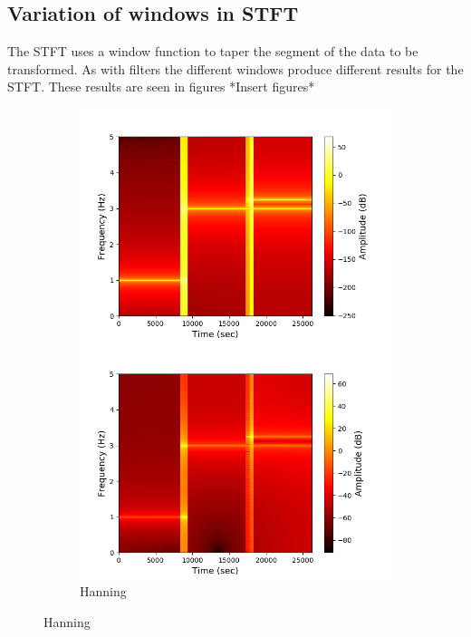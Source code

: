 \subsection{Variation of windows in STFT}
The STFT uses a window function to taper the segment of the data to be transformed. As with filters the different windows produce different results for the STFT. These results are seen in figures *Insert figures*
\begin{figure}
\centering
\begin{subfigure}{0.49\textwidth}
\centering
\includegraphics[width=\textwidth]{figures/stft_windows/hanning_10000.png}
\caption{Hanning}
\label{fig:stft_hanning}
\includegraphics[width=\textwidth]{figures/stft_windows/hamming_10000.png}

\end{subfigure}
\end{figure}

